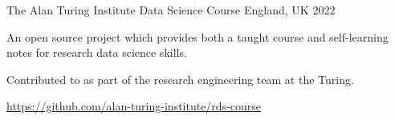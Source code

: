 \begin{cventries}
  \cventry
    {The Alan Turing Institute} %
    {Data Science Course} %
    {England, UK} %
    {2022} %
    {
      \begin{cvitems} %
        \item {An open source project which provides both a taught course and self-learning notes for research data science skills.}
        \item{Contributed to as part of the research engineering team at the Turing.}
        \item {\url{https://github.com/alan-turing-institute/rds-course}}
      \end{cvitems}
    }

\end{cventries}
